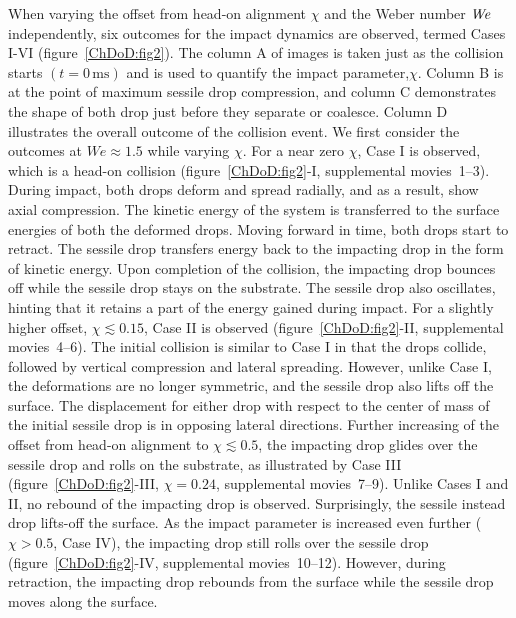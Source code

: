 When varying the offset from head-on alignment $\chi$ and the Weber number $\mathit{We}$ independently, six outcomes for the impact dynamics are observed, termed Cases I-VI (figure~\ref{ChDoD:fig2}). The column A of images is taken just as the collision starts $\left( t = 0\,\si{\milli\second}\right)$ and is used to quantify the impact parameter,$\chi$. Column B is at the point of maximum sessile drop compression, and column C demonstrates the shape of both drop just before they separate or coalesce. Column D illustrates the overall outcome of the collision event. We first consider the outcomes at $We \approx 1.5$ while varying $\chi$. For a near zero $\chi$, Case I is observed, which is a head-on collision (figure~\ref{ChDoD:fig2}-I, supplemental movies~{\color{Myfig}1--3}). During impact, both drops deform and spread radially, and as a result, show axial compression. The kinetic energy of the system is transferred to the surface energies of both the deformed drops. Moving forward in time, both drops start to retract. The sessile drop transfers energy back to the impacting drop in the form of kinetic energy. Upon completion of the collision, the impacting drop bounces off while the sessile drop stays on the substrate. The sessile drop also oscillates, hinting that it retains a part of the energy gained during impact. For a slightly higher offset, $\chi \lesssim 0.15$, Case II is observed (figure~\ref{ChDoD:fig2}-II, supplemental movies~{\color{Myfig}4--6}). The initial collision is similar to Case I in that the drops collide, followed by vertical compression and lateral spreading.  However, unlike Case I, the deformations are no longer symmetric, and the sessile drop also lifts off the surface. The displacement for either drop with respect to the center of mass of the initial sessile drop is in opposing lateral directions. Further increasing of the offset from head-on alignment to $\chi \lesssim 0.5$, the impacting drop glides over the sessile drop and rolls on the substrate, as illustrated by Case III (figure~\ref{ChDoD:fig2}-III, $\chi=0.24$, supplemental movies~{\color{Myfig}7--9}). Unlike Cases I and II, no rebound of the impacting drop is observed. Surprisingly, the sessile instead drop lifts-off the surface. As the impact parameter is increased even further ($\chi > 0.5$, Case IV), the impacting drop still rolls over the sessile drop (figure~\ref{ChDoD:fig2}-IV, supplemental movies~{\color{Myfig}10--12}). However, during retraction, the impacting drop rebounds from the surface while the sessile drop moves along the surface.
	
